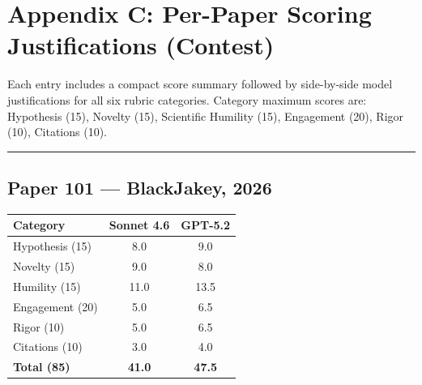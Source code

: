 \documentclass[11pt]{article}
\begin{document}
\section*{Appendix C: Per-Paper Scoring Justifications (Contest)}

Each entry includes a compact score summary followed by side-by-side model justifications
for all six rubric categories. Category maximum scores are: Hypothesis (15), Novelty (15),
Scientific Humility (15), Engagement (20), Rigor (10), Citations (10).

\tableofcontents

\bigskip
\hrule
\bigskip

\subsection*{Paper 101 --- BlackJakey, 2026}

\medskip

\begin{tabular}{lcc}
\toprule
\textbf{Category} & \textbf{Sonnet 4.6} & \textbf{GPT-5.2} \\
\midrule
Hypothesis (15) & 8.0 & 9.0 \\
Novelty (15) & 9.0 & 8.0 \\
Humility (15) & 11.0 & 13.5 \\
Engagement (20) & 5.0 & 6.5 \\
Rigor (10) & 5.0 & 6.5 \\
Citations (10) & 3.0 & 4.0 \\
\midrule
\textbf{Total (85)} & \textbf{41.0} & \textbf{47.5} \\
\bottomrule
\end{tabular}

\bigskip
\end{document}
